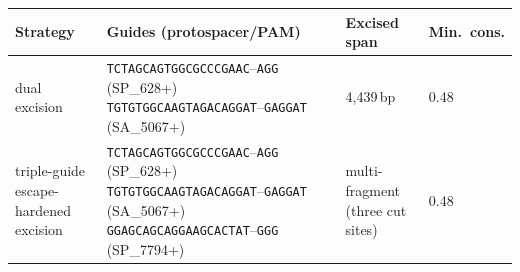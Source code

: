\begin{tabular}{p{2.6cm}p{5.6cm}p{2.2cm}p{1.8cm}}
\toprule
Strategy & Guides (protospacer/PAM) & Excised span & Min.\ cons. \\
\midrule
dual excision & \texttt{TCTAGCAGTGGCGCCCGAAC}--\texttt{AGG} (SP\_628+) \newline \texttt{TGTGTGGCAAGTAGACAGGAT}--\texttt{GAGGAT} (SA\_5067+) & 4,439\,bp & 0.48 \\
triple-guide escape-hardened excision & \texttt{TCTAGCAGTGGCGCCCGAAC}--\texttt{AGG} (SP\_628+) \newline \texttt{TGTGTGGCAAGTAGACAGGAT}--\texttt{GAGGAT} (SA\_5067+) \newline \texttt{GGAGCAGCAGGAAGCACTAT}--\texttt{GGG} (SP\_7794+) & multi-fragment (three cut sites) & 0.48 \\
\bottomrule
\end{tabular}
